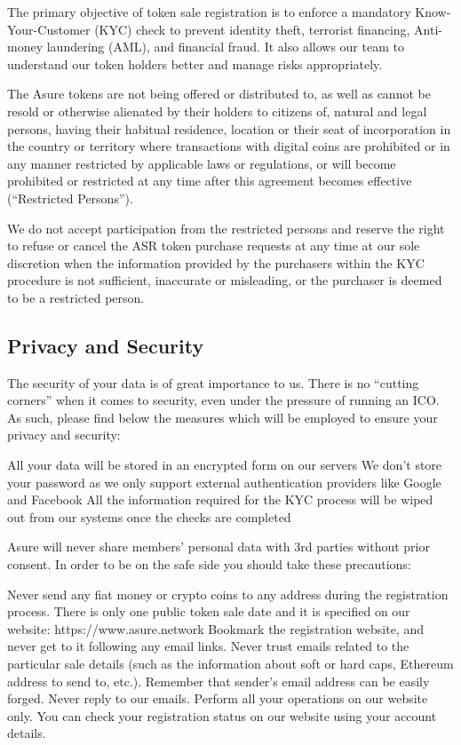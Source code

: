The primary objective of token sale registration is to enforce a mandatory Know-Your-Customer (KYC) check to prevent identity theft, terrorist financing, Anti-money laundering (AML), and financial fraud. It also allows our team to understand our token holders better and manage risks appropriately.

The Asure tokens are not being offered or distributed to, as well as cannot be resold or otherwise alienated by their holders to citizens of, natural and legal persons, having their habitual residence, location or their seat of incorporation in the country or territory where transactions with digital coins are prohibited or in any manner restricted by applicable laws or regulations, or will become prohibited or restricted at any time after this agreement becomes effective (“Restricted Persons”).

We do not accept participation from the restricted persons and reserve the right to refuse or cancel the ASR token purchase requests at any time at our sole discretion when the information provided by the purchasers within the KYC procedure is not sufficient, inaccurate or misleading, or the purchaser is deemed to be a restricted person.

\subsection{Privacy and Security}
The security of your data is of great importance to us. There is no “cutting corners” when it comes to security, even under the pressure of running an ICO.  As such, please find below the measures which will be employed to ensure your privacy and security: 

All your data will be stored in an encrypted form on our servers
We don’t store your password as we only support external authentication providers like Google and Facebook
All the information required for the KYC process will be wiped out from our systems once the checks are completed

Asure will never share members’ personal data with 3rd parties without prior consent. In order to be on the safe side you should take these precautions: 

Never send any fiat money or crypto coins to any address during the registration process. There is only one public token sale date and it is specified on our 
website: https://www.asure.network
Bookmark the registration website, and never get to it following any email links.
Never trust emails related to the particular sale details (such as the information about soft or hard caps, Ethereum address to send to, etc.). Remember that sender’s email address can be easily forged. 
Never reply to our emails. Perform all your operations on our website only. You can check your registration status on our website using your account details. 


